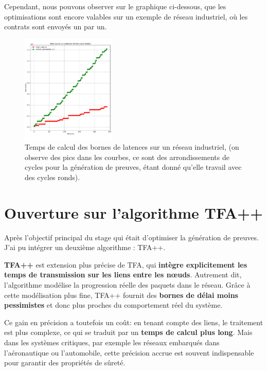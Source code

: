 \documentclass[12pt]{report}
\begin{document}
\bigskip

Cependant, nous pouvons observer sur le graphique ci-dessous, que les optimisations sont 
encore valables sur un exemple de réseau industriel, où les contrats sont envoyés 
un par un.

\begin{figure}[H]
    \centering
    \includegraphics[width=0.4\textwidth]{benchmark_indusnet.pdf}
    \caption{Temps de calcul des bornes de latences sur un réseau industriel, 
    (on observe des pics dans
    les courbes, ce sont des arrondissements de cycles pour la génération de preuves, étant donné qu'elle travail avec des cycles ronds).}
\end{figure}



\chapter{Ouverture sur l'algorithme TFA++}

Après l'objectif principal du stage qui était d'optimiser la génération de preuves.
J'ai pu intégrer un deuxième algorithme : TFA++.

\bigskip

\textbf{TFA++} est extension plus précise de TFA, qui 
\textbf{intègre explicitement les temps de transmission sur les 
liens entre les nœuds}. Autrement dit, l'algorithme modélise la 
progression réelle des paquets dans le réseau. Grâce à cette modélisation plus fine, 
TFA++ fournit des \textbf{bornes de délai moins pessimistes} et 
donc plus proches du comportement réel du système.

\bigskip

Ce gain en précision a toutefois un coût: en tenant compte des 
liens, le traitement est plus complexe, ce qui se traduit 
par un \textbf{temps de calcul plus long}. Mais dans les 
systèmes critiques, par exemple les réseaux embarqués dans 
l'aéronautique ou l'automobile, cette précision accrue est 
souvent indispensable pour garantir des propriétés de sûreté.
\end{document}
